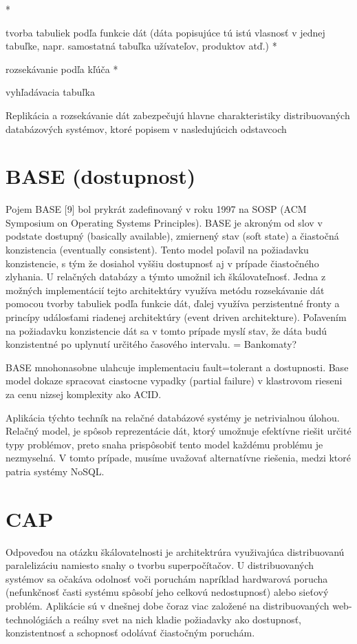 \documentclass[11pt,twoside,a4paper]{book}
\begin{document}
    *

      tvorba tabuliek podľa funkcie dát (dáta popisujúce tú istú vlasnosť v jednej tabuľke, napr. samostatná tabuľka užívateľov, produktov atď.)
    *

      rozsekávanie podľa kľúča
    *

      vyhľadávacia tabuľka


Replikácia a rozsekávanie dát zabezpečujú hlavne charakteristiky distribuovaných databázových systémov, ktoré popisem v nasledujúcich odstavcoch

\section{BASE (dostupnost)}

Pojem BASE [9] bol prykrát zadefinovaný v roku 1997 na SOSP (ACM Symposium on Operating Systems Principles). BASE je akroným od slov v podstate dostupný (basically available), zmiernený stav (soft state) a čiastočná konzistencia (eventually consistent). Tento model poľavil na požiadavku konzistencie, s tým že dosiahol vyššiu dostupnosť aj v prípade čiastočného zlyhania. U relačných databázy a týmto umožnil ich škálovateľnosť. Jedna z možných implementácií tejto architektúry využíva metódu rozsekávanie dát pomocou tvorby tabuliek podľa funkcie dát, ďalej využíva perzistentné fronty a princípy událosťami riadenej architektúry (event driven architekture). Poľavením na požiadavku konzistencie dát sa v tomto prípade myslí stav, že dáta budú konzistentné po uplynutí určitého časového intervalu. = Bankomaty?

BASE mnohonasobne ulahcuje implementaciu fault=tolerant a dostupnosti. Base model dokaze spracovat ciastocne vypadky (partial failure) v klastrovom rieseni za cenu nizsej komplexity ako ACID.


Aplikácia týchto techník na relačné databázové systémy je netrivialnou úlohou. Relačný model, je spôsob reprezentácie dát, ktorý umožnuje efektívne riešit určité typy problémov, preto snaha prispôsobiť tento model každému problému je nezmyselná. V tomto prípade, musíme uvažovať alternatívne riešenia, medzi ktoré patria systémy NoSQL.

\section{CAP}

Odpoveďou na otázku škálovatelnosti je architektrúra využivajúca distribuovanú paralelizáciu namiesto snahy o tvorbu superpočítačov. U distribuovaných systémov sa očakáva odolnosť voči poruchám napríklad hardwarová porucha (nefunkčnosť časti systému spôsobí jeho celkovú nedostupnosť) alebo sieťový problém. Aplikácie sú v dnešnej dobe čoraz viac založené na distribuovaných web-technológiách a reálny svet na nich kladie požiadavky ako dostupnosť, konzistentnosť a schopnosť odolávať čiastočným poruchám.
\end{document}
